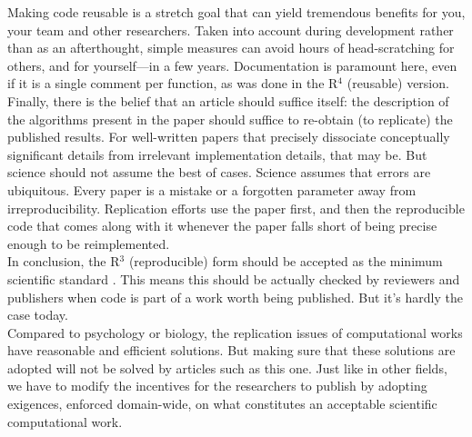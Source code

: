 \documentclass[a4paper,11pt]{article}
\begin{document}
Making code reusable is a stretch goal that can yield tremendous benefits for you, your team and other researchers. Taken into account during development rather than as an afterthought, simple measures can avoid hours of head-scratching for others, and for yourself—in a few years. Documentation is paramount here, even if it is a single comment per function, as was done in the R$^4$ (reusable) version.\\

Finally, there is the belief that an article should suffice itself: the description of the algorithms present in the paper should suffice to re-obtain (to replicate) the published results. For well-written papers that precisely dissociate conceptually significant details from irrelevant implementation details, that may be. But science should not assume the best of cases. Science assumes that errors are ubiquitous. Every paper is a mistake or a forgotten parameter away from irreproducibility. Replication efforts use the paper first, and then the reproducible code that comes along with it whenever the paper falls short of being precise enough to be reimplemented.\\

In conclusion, the R$^3$ (reproducible) form should be accepted as the minimum
scientific standard \citep{Wilson:2017}. This means this should be actually
checked by reviewers and publishers when code is part of a work worth being
published. But it's hardly the case today.\\


Compared to psychology or biology, the replication issues of computational works have reasonable and efficient solutions. But making sure that these solutions are adopted will not be solved by articles such as this one. Just like in other fields, we have to modify the incentives for the researchers to publish by adopting exigences, enforced domain-wide, on what constitutes an acceptable scientific computational work.
\end{document}
